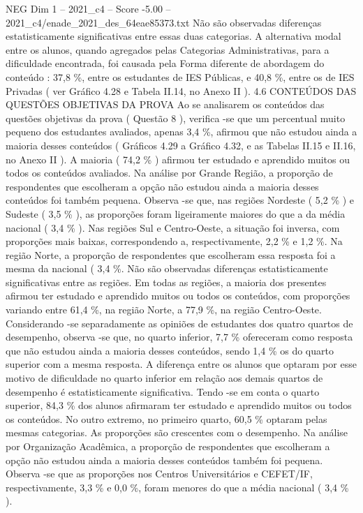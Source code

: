 \begin{textsample}{NEG Dim 1 – 2021\_c4 – Score -5.00 – 2021\_c4/enade\_2021\_des\_64eae85373.txt}
Não são observadas diferenças estatisticamente significativas entre essas duas categorias.
A alternativa modal entre os alunos, quando agregados pelas Categorias Administrativas, para a dificuldade encontrada, foi causada pela Forma diferente de abordagem do conteúdo : 37,8 \%, entre os estudantes de IES Públicas, e 40,8 \%, entre os de IES Privadas ( ver Gráfico 4.28 e Tabela II.14, no Anexo II ). 4.6 CONTEÚDOS DAS QUESTÕES OBJETIVAS DA PROVA Ao se analisarem os conteúdos das questões objetivas da prova ( Questão 8 ), verifica -se que um percentual muito pequeno dos estudantes avaliados, apenas 3,4 \%, afirmou que não estudou ainda a maioria desses conteúdos ( Gráficos 4.29 a Gráfico 4.32, e as Tabelas II.15 e II.16, no Anexo II ).
A maioria ( 74,2 \% ) afirmou ter estudado e aprendido muitos ou todos os conteúdos avaliados.
Na análise por Grande Região, a proporção de respondentes que escolheram a opção não estudou ainda a maioria desses conteúdos foi também pequena.
Observa -se que, nas regiões Nordeste ( 5,2 \% ) e Sudeste ( 3,5 \% ), as proporções foram ligeiramente maiores do que a da média nacional ( 3,4 \% ).
Nas regiões Sul e Centro-Oeste, a situação foi inversa, com proporções mais baixas, correspondendo a, respectivamente, 2,2 \% e 1,2 \%.
Na região Norte, a proporção de respondentes que escolheram essa resposta foi a mesma da nacional ( 3,4 \%.
Não são observadas diferenças estatisticamente significativas entre as regiões.
Em todas as regiões, a maioria dos presentes afirmou ter estudado e aprendido muitos ou todos os conteúdos, com proporções variando entre 61,4 \%, na região Norte, a 77,9 \%, na região Centro-Oeste.
Considerando -se separadamente as opiniões de estudantes dos quatro quartos de desempenho, observa -se que, no quarto inferior, 7,7 \% ofereceram como resposta que não estudou ainda a maioria desses conteúdos, sendo 1,4 \% os do quarto superior com a mesma resposta.
A diferença entre os alunos que optaram por esse motivo de dificuldade no quarto inferior em relação aos demais quartos de desempenho é estatisticamente significativa.
Tendo -se em conta o quarto superior, 84,3 \% dos alunos afirmaram ter estudado e aprendido muitos ou todos os conteúdos.
No outro extremo, no primeiro quarto, 60,5 \% optaram pelas mesmas categorias.
As proporções são crescentes com o desempenho.
Na análise por Organização Acadêmica, a proporção de respondentes que escolheram a opção não estudou ainda a maioria desses conteúdos também foi pequena.
Observa -se que as proporções nos Centros Universitários e CEFET/IF, respectivamente, 3,3 \% e 0,0 \%, foram menores do que a média nacional ( 3,4 \% ).

\end{textsample}
